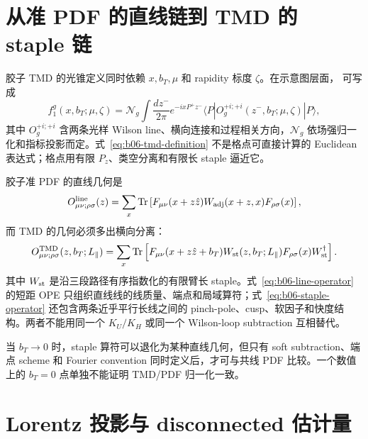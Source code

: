 \section{从准 PDF 的直线链到 TMD 的 staple 链}

胶子 TMD 的光锥定义同时依赖 \(x,b_T,\mu\) 和 rapidity 标度 \(\zeta\)。在示意图层面，
可写成
\begin{equation}
  f_1^g(x,b_T;\mu,\zeta)
  =\mathcal N_g\int\frac{dz^-}{2\pi}
  e^{-ixP^+z^-}
  \langle P|O_g^{+i;+i}(z^-,b_T;\mu,\zeta)|P\rangle,
  \label{eq:b06-tmd-definition}
\end{equation}
其中 \(O_g^{+i;+i}\) 含两条光样 Wilson line、横向连接和过程相关方向，\(\mathcal N_g\)
依场强归一化和指标投影而定。式~\eqref{eq:b06-tmd-definition} 不是格点可直接计算的
Euclidean 表达式；格点用有限 \(P_z\)、类空分离和有限长 staple 逼近它。

胶子准 PDF 的直线几何是
\begin{equation}
  O^{\rm line}_{\mu\nu;\rho\sigma}(z)
  =\sum_x\operatorname{Tr}\left[
  F_{\mu\nu}(x+z\hat z)
  W_{\rm adj}(x+z,x)
  F_{\rho\sigma}(x)
  \right],
  \label{eq:b06-line-operator}
\end{equation}
而 TMD 的几何必须多出横向分离：
\begin{equation}
  O^{\rm TMD}_{\mu\nu;\rho\sigma}(z,b_T;L_\parallel)
  =\sum_x\operatorname{Tr}\left[
  F_{\mu\nu}(x+z\hat z+b_T)
  W_{\rm st}(z,b_T;L_\parallel)
  F_{\rho\sigma}(x)W^\dagger_{\rm st}
  \right].
  \label{eq:b06-staple-operator}
\end{equation}
其中 \(W_{\rm st}\) 是沿三段路径有序指数化的有限臂长 staple。式~\eqref{eq:b06-line-operator}
的短距 OPE 只组织直线线的线质量、端点和局域算符；式~\eqref{eq:b06-staple-operator}
还包含两条近乎平行长线之间的 pinch-pole、cusp、软因子和快度结构。两者不能用同一个
\(K_U/K_H\) 或同一个 Wilson-loop subtraction 互相替代。

当 \(b_T\to0\) 时，staple 算符可以退化为某种直线几何，但只有 soft subtraction、端点
scheme 和 Fourier convention 同时定义后，才可与共线 PDF 比较。一个数值上的
\(b_T=0\) 点单独不能证明 TMD/PDF 归一化一致。

\section{Lorentz 投影与 disconnected 估计量}

